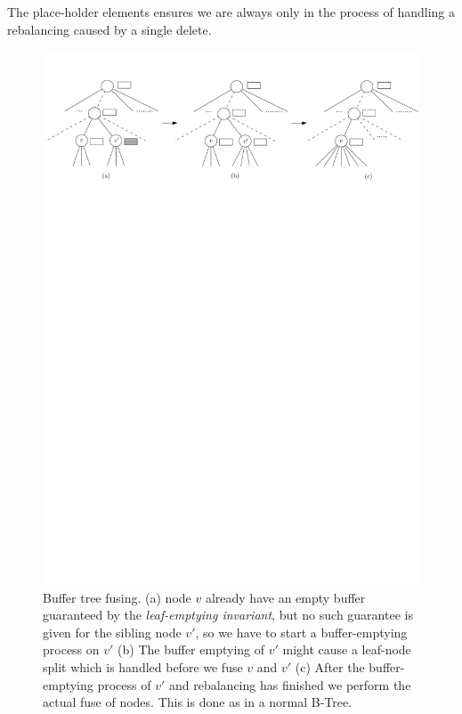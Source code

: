 \documentclass[twoside,11pt,openright]{report}
\begin{document}
The place-holder elements ensures we are always only in the process of handling a rebalancing caused by a single delete.

\begin{figure}[H]
	\centering
	\includegraphics[width=1\textwidth]{../figures/buffer_tree_fuse_v2}
	\caption{Buffer tree fusing. (a) node $v$ already have an empty buffer guaranteed by the \textit{leaf-emptying invariant}, but no such guarantee is given for the sibling node $v'$, so we have to start a buffer-emptying process on $v'$ (b) The buffer emptying of $v'$ might cause a leaf-node split which is handled before we fuse $v$ and $v'$ (c) After the buffer-emptying process of $v'$ and rebalancing has finished we perform the actual fuse of nodes. This is done as in a normal B-Tree.}
	\label{fig:buffer_tree_fuse}
\end{figure}
\end{document}
